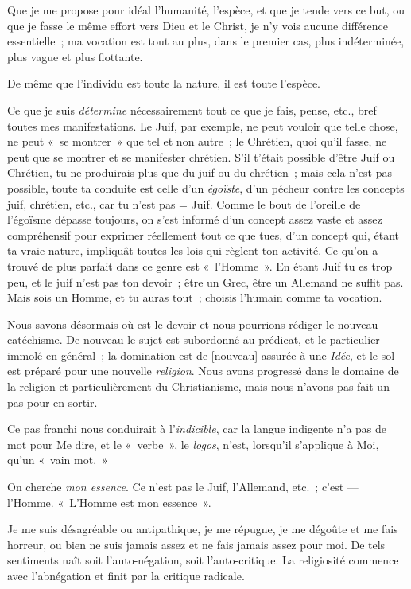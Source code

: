 \documentclass[french,twoside]{book} %
\newcommand\corr[1]{#1}
\begin{document}
 Que je me propose pour idéal l’humanité, l’espèce, et que je tende vers ce but, ou que je fasse le même effort vers Dieu et le Christ, je n’y vois aucune différence essentielle ; ma vocation est tout au plus, dans le premier cas, plus indéterminée, plus vague et plus flottante.\par
De même que l’individu est toute la nature, il est toute l’espèce.\par
Ce que je suis \emph{détermine} nécessairement tout ce que je fais, pense, etc., bref toutes mes manifestations. Le Juif, par exemple, ne peut vouloir que telle chose, ne peut « se montrer » que tel et non autre ; le Chrétien, quoi qu’il fasse, ne peut que se montrer et se manifester chrétien. S’il t’était possible d’être Juif ou Chrétien, tu ne produirais plus que du juif ou du chrétien ; mais cela n’est pas possible, toute ta conduite est celle d’un \emph{égoïste}, d’un pécheur contre les concepts juif, chrétien, etc., car tu n’est pas = Juif. Comme le bout de l’oreille de l’égoïsme dépasse toujours, on s’est informé d’un concept assez vaste et assez compréhensif pour exprimer réellement tout ce que tues, d’un concept qui, étant ta vraie nature, impliquât toutes les lois qui règlent ton activité. Ce qu’on a trouvé de plus parfait dans ce genre est « l’Homme ». En étant Juif tu es trop peu, et le juif n’est pas ton devoir ; être un Grec, être un Allemand ne suffit pas. Mais sois un Homme, et tu auras tout ; choisis l’humain comme ta vocation.\par
Nous savons désormais où est le devoir et nous pourrions rédiger le nouveau catéchisme. De nouveau le sujet est subordonné au prédicat, et le particulier immolé en général ; la domination est de [{\corr nouveau}] assurée à une \emph{Idée}, et le sol est préparé pour une nouvelle \emph{religion}. Nous avons progressé dans le domaine de la religion et particulièrement du Christianisme, mais nous n’avons pas fait un pas pour en sortir.\par
Ce pas franchi nous conduirait à l’\emph{indicible}, car la  langue indigente n’a pas de mot pour Me dire, et le « verbe », le \emph{logos}, n’est, lorsqu’il s’applique à Moi, qu’un « vain mot. »\par
On cherche \emph{mon essence}. Ce n’est pas le Juif, l’Allemand, etc. ; c’est — l’Homme. « L’Homme est mon essence ».\par
Je me suis désagréable ou antipathique, je me répugne, je me dégoûte et me fais horreur, ou bien ne suis jamais assez et ne fais jamais assez pour moi. De tels sentiments naît soit l’auto-négation, soit l’auto-critique. La religiosité commence avec l’abnégation et finit par la critique radicale.\par
\end{document}

